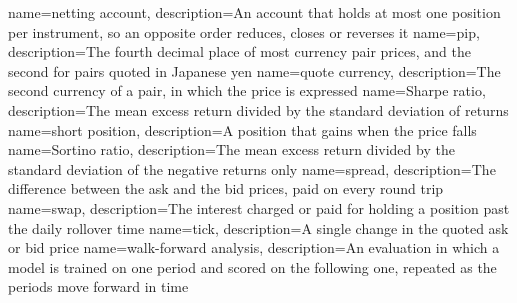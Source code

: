 {
    name=netting account,
    description={An account that holds at most one position per instrument, so an opposite order reduces, closes or reverses it}
}
{
    name=pip,
    description={The fourth decimal place of most currency pair prices, and the second for pairs quoted in Japanese yen}
}
{
    name=quote currency,
    description={The second currency of a pair, in which the price is expressed}
}
{
    name=Sharpe ratio,
    description={The mean excess return divided by the standard deviation of returns}
}
{
    name=short position,
    description={A position that gains when the price falls}
}
{
    name=Sortino ratio,
    description={The mean excess return divided by the standard deviation of the negative returns only}
}
{
    name=spread,
    description={The difference between the ask and the bid prices, paid on every round trip}
}
{
    name=swap,
    description={The interest charged or paid for holding a position past the daily rollover time}
}
{
    name=tick,
    description={A single change in the quoted ask or bid price}
}
{
    name=walk-forward analysis,
    description={An evaluation in which a model is trained on one period and scored on the following one, repeated as the periods move forward in time}
}
\glsaddall